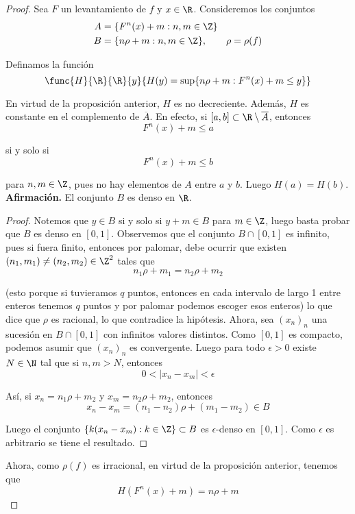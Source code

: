 \documentclass[	docname= Sistemas\ Din\'amicos,
				finished=1,
				semester=1,
				year=2017,
				professor=Godofredo\ Iommi,
				sigla=MAT2565]{apunte}
\begin{document}
\begin{proof} Sea $F$ un levantamiento de $f$ y $x \in \R$. Consideremos los conjuntos
	\begin{align*}
		A	&=	\{F^{n}(x) + m : n, m \in \Z\}	\\
		B	&=	\{n \rho + m : n,m \in \Z\},	 \qquad \rho = \rho(f)
	\end{align*}

Definamos la función
	$$\func{H}{\R}{\R}
			{y}{H(y) = \sup\{n\rho + m : F^{n}(x) + m \leq y\}}$$
		
En virtud de la proposición anterior, $H$ es no decreciente. Además, $H$ es constante en el complemento de $\overline{A}$. En efecto, si $[a,b] \subset \R \setminus \overline{A}$, entonces
	$$F^{n}(x) + m \leq a$$

si y solo si
	$$F^{n}(x) + m \leq b$$

para $n,m \in \Z$, pues no hay elementos de $A$ entre $a$ y $b$. Luego $H(a) = H(b)$.	\\

\textbf{Afirmación.} El conjunto $B$ es denso en $\R$.

\begin{proof} Notemos que $y \in B$ si y solo si $y + m \in B$ para $m \in \Z$, luego basta probar que $B$ es denso en $[0,1]$. Observemos que el conjunto $B \cap [0,1]$ es infinito, pues si fuera finito, entonces por palomar, debe ocurrir que existen $(n_{1}, m_{1})\neq (n_{2}, m_{2}) \in \Z^{2}$ tales que
	$$n_{1}\rho + m_{1} = n_{2}\rho + m_{2}$$

(esto porque si tuvieramos $q$ puntos, entonces en cada intervalo de largo 1 entre enteros tenemos $q$ puntos y por palomar podemos escoger esos enteros) lo que dice que $\rho$ es racional, lo que contradice la hipótesis. Ahora, sea $(x_{n})_{n}$ una sucesión en $B \cap [0,1]$ con infinitos valores distintos. Como $[0,1]$ es compacto, podemos asumir que $(x_{n})_{n}$ es convergente. Luego para todo $\epsilon > 0$ existe $N \in \N$ tal que si $n,m > N$, entonces
	$$0 < |x_{n} - x_{m}| < \epsilon$$

Así, si $x_{n} = n_{1}\rho + m_{2}$ y $x_{m} = n_{2}\rho + m_{2}$, entonces
	$$x_{n} - x_{m} = (n_{1} - n_{2})\rho + (m_{1} - m_{2}) \in B$$

Luego el conjunto $\{k(x_{n} - x_{m}) : k \in \Z\} \subset B$ es $\epsilon$-denso en $[0,1]$. Como $\epsilon$ es arbitrario se tiene el resultado.  
\end{proof}
 
Ahora, como $\rho(f)$ es irracional, en virtud de la proposición anterior, tenemos que
	$$H(F^{n}(x) + m) = n\rho + m$$


\end{proof}
\end{document}

